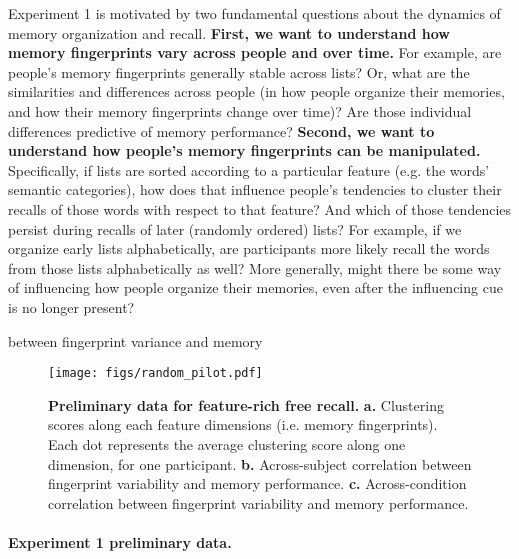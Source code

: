Experiment 1 is motivated by two fundamental questions about the dynamics of
memory organization and recall. \textbf{First, we want to understand how memory
fingerprints vary across people and over time.} For example, are people's
memory fingerprints generally stable across lists? Or, what are the
similarities and differences across people (in how people organize their
memories, and how their memory fingerprints change over time)? Are those
individual differences predictive of memory performance? \textbf{Second, we
want to understand how people's memory fingerprints can be manipulated.}
Specifically, if lists are sorted according to a particular feature (e.g. the
words' semantic categories), how does that influence people's tendencies to
cluster their recalls of those words with respect to that feature? And which of
those tendencies persist during recalls of later (randomly ordered) lists? For
example, if we organize early lists alphabetically, are participants more
likely recall the words from those lists alphabetically as well? More
generally, might there be some way of influencing how people organize their
memories, even after the influencing cue is no longer present?

between fingerprint variance and memory \begin{wrapfigure}[10]{R}{4.0in}
\vspace{-52pt} \begin{center}
\texttt{[image: figs/random\_pilot.pdf]} \end{center}
\vspace{-18pt} \caption{\footnotesize \textbf{Preliminary data for feature-rich
free recall.} \textbf{a.} Clustering scores along each feature dimensions (i.e.
memory fingerprints). Each dot represents the average clustering score along
one dimension, for one participant. \textbf{b.} Across-subject correlation
between fingerprint variability and memory performance. \textbf{c.}
Across-condition correlation between fingerprint variability and memory
performance.} \label{fig:random_pilot} \end{wrapfigure}

\paragraph{Experiment 1 preliminary data.}

